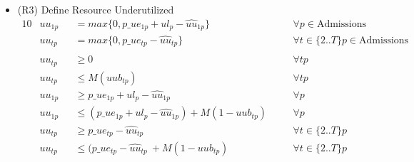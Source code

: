 \begin{itemize}
	\item(R3) Define Resource Underutilized
	\begin{alignat}{10}
		& uu_{1p} 
			&& = max\{0 , p\_{ue}_{1p} + ul_{p} - \hat{uu}_{1p}\} \quad 
			&& \forall p \in {\text{Admissions}} \\ 
		& uu_{tp} 
			&& = max\{0 , p\_{ue}_{tp} - \hat{uu}_{tp}\} \quad
			&& \forall t \in \{2..T\} p \in {\text{Admissions}} \\ \\
		& uu_{tp} 
			&&\ge 0 \quad
			&& \forall tp \\
		& uu_{tp} 
			&& \le  M(uub_{tp}) \quad
			&& \forall tp \\
		& uu_{1p} 
			&&\ge p\_{ue}_{1p} + ul_{p} - \hat{uu}_{1p} \quad
			&& \forall p \\
		& uu_{1p} 
		&& \le  (p\_{ue}_{1p} + ul_{p} - \hat{uu}_{1p}) + M(1-uub_{tp}) \quad
		&& \forall p \\
		& uu_{tp} 
			&&\ge p\_{ue}_{tp} - \hat{uu}_{tp}\ \quad
			&& \forall t \in \{2..T \} p \\
		& uu_{tp} 
		&& \le  (p\_{ue}_{tp} - \hat{uu}_{tp}\ + M(1-uub_{tp}) \quad
		&& \forall t \in \{ 2..T \} p \\
	\end{alignat}
\end{itemize}

